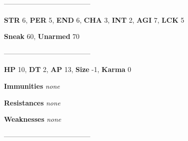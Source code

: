 \documentclass[11pt,a4paper,twocolumn]{book}
\begin{document}
%		
%	
%		

	--------------------------------------
	
	\noindent
	\textbf{STR} 6, \textbf{PER} 5, \textbf{END} 6, \textbf{CHA} 3, \textbf{INT} 2, \textbf{AGI} 7, \textbf{LCK} 5
	
	\noindent
	\textbf{Sneak} 60, \textbf{Unarmed} 70
	
	--------------------------------------
	
	\noindent
	\textbf{HP} 10, \textbf{DT} 2, \textbf{AP} 13, \textbf{Size} -1, \textbf{Karma} 0
	
	
	\noindent
	\textbf{Immunities} \emph{none}
	
	\noindent
	\textbf{Resistances} \emph{none}
	
	\noindent
	\textbf{Weaknesses} \emph{none} %
	
	--------------------------------------
	
\end{document}
